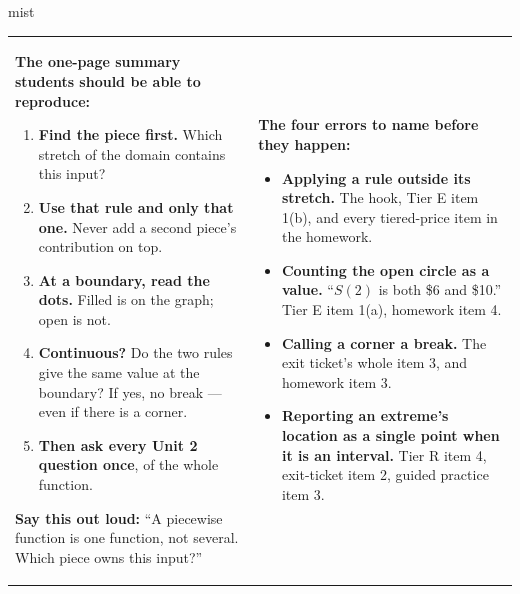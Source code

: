 \documentclass[10pt]{article}
\begin{document}
\boxguard
\begin{skillbox}{mist}
\begin{tabularx}{\linewidth}{@{}X|X@{}}
\begin{minipage}[t]{\linewidth}\vspace{0pt}
\textbf{The one-page summary students should be able to reproduce:}
\begin{enumerate}[leftmargin=1.4em, itemsep=1pt, topsep=2pt]
  \item \textbf{Find the piece first.} Which stretch of the domain contains this input?
  \item \textbf{Use that rule and only that one.} Never add a second piece's contribution on top.
  \item \textbf{At a boundary, read the dots.} Filled is on the graph; open is not.
  \item \textbf{Continuous?} Do the two rules give the same value at the boundary? If yes, no break
        --- even if there is a corner.
  \item \textbf{Then ask every Unit 2 question once}, of the whole function.
\end{enumerate}
\textbf{Say this out loud:} ``A piecewise function is one function, not several. Which piece owns
this input?''
\end{minipage}
&
\begin{minipage}[t]{\linewidth}\vspace{0pt}
\textbf{The four errors to name before they happen:}
\begin{itemize}[leftmargin=1.1em, itemsep=2pt, topsep=2pt]
  \item \textbf{Applying a rule outside its stretch.} The hook, Tier E item 1(b), and every
        tiered-price item in the homework.
  \item \textbf{Counting the open circle as a value.} ``$S(2)$ is both \$6 and \$10.'' Tier E item
        1(a), homework item 4.
  \item \textbf{Calling a corner a break.} The exit ticket's whole item 3, and homework item 3.
  \item \textbf{Reporting an extreme's location as a single point when it is an interval.} Tier R
        item 4, exit-ticket item 2, guided practice item 3.
\end{itemize}
\end{minipage}
\end{tabularx}
\end{skillbox}
\end{document}
